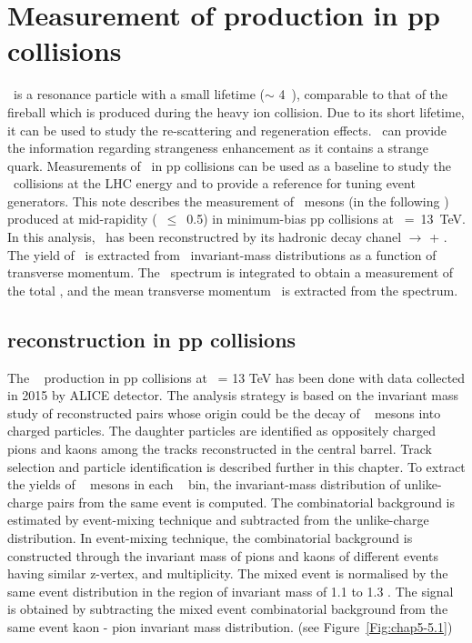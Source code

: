 \chapter{Measurement of \kcharged production in pp collisions}
\label{cap:5}
\vspace*{2cm}
\kstarch~is a resonance particle with a small lifetime ($\sim$ 4~\fmc), comparable to that of the fireball which is produced during the heavy ion collision. Due to its short lifetime, it can be used to study the re-scattering and regeneration effects. \kstarch~can provide the information regarding strangeness enhancement as it contains a strange quark. Measurements of \kstarch~in pp collisions can be used as a baseline to study the \PbPb~collisions at the LHC energy and to provide a reference for tuning event generators.  
This note describes the measurement of \kstarch~mesons (in the following \simplekstarch) produced at mid-rapidity (\modrap~$\leq$~0.5) in minimum-bias pp collisions at \sqrtS~=~13~TeV. In this analysis, \simplekstarch~has been reconstructred by its hadronic decay chanel \kstarch $\rightarrow$  \ppm + \kshort. The yield of \simplekstarch~is extracted from \pion\kshort~invariant-mass distributions as a function of transverse momentum. 
The \pT~spectrum is integrated to obtain a measurement of the total \dndy, and the mean transverse momentum \meanpT~is extracted from the spectrum. 


\section{\kzero reconstruction in pp collisions}
\label{par:5.1}
The \kcharged~ production in pp collisions at \sqrtS~= 13 TeV has been done with data collected in 2015 by ALICE detector. The analysis strategy is based on the invariant mass study of reconstructed pairs whose origin could be the decay of \kzero~ mesons into charged particles. The daughter particles are identified as oppositely charged pions and kaons among the tracks reconstructed in the central barrel. Track selection and particle identification is described further in this chapter. To extract the yields of \kzero~ mesons in each \pT~ bin, the invariant-mass distribution of unlike-charge pairs from the same event is computed. The combinatorial background is estimated by event-mixing technique and subtracted from the unlike-charge distribution. In event-mixing technique, the combinatorial background is constructed through the invariant mass of pions and kaons of different events having similar z-vertex, and multiplicity. The mixed event is normalised by the same event distribution in the region of invariant mass of 1.1 to 1.3 \GeVcSq. The signal is obtained by subtracting the mixed event combinatorial background from the same event kaon - pion invariant mass distribution. (see \mbox{Figure \ref{Fig:chap5-5.1}})

